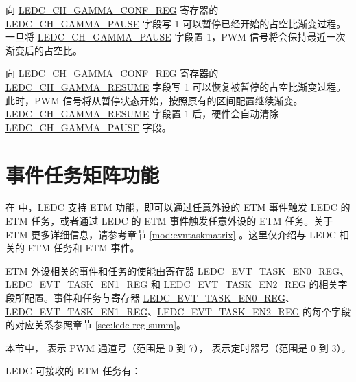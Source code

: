 \documentclass[main\_\_CN.tex]{subfiles}
\begin{document}
向 \hyperref[regdesc:LEDCCHNGAMMACONFREG]{LEDC\_CH\_GAMMA\_CONF\_REG} 寄存器的 \hyperref[fielddesc:LEDCCHNGAMMAPAUSE]{LEDC\_CH\_GAMMA\_PAUSE} 字段写 1 可以暂停已经开始的占空比渐变过程。一旦将 \hyperref[fielddesc:LEDCCHNGAMMAPAUSE]{LEDC\_CH\_GAMMA\_PAUSE} 字段置 1，PWM 信号将会保持最近一次渐变后的占空比。

向 \hyperref[regdesc:LEDCCHNGAMMACONFREG]{LEDC\_CH\_GAMMA\_CONF\_REG} 寄存器的 \hyperref[fielddesc:LEDCCHNGAMMARESUME]{LEDC\_CH\_GAMMA\_RESUME} 字段写 1 可以恢复被暂停的占空比渐变过程。此时，PWM 信号将从暂停状态开始，按照原有的区间配置继续渐变。\hyperref[fielddesc:LEDCCHNGAMMARESUME]{LEDC\_CH\_GAMMA\_RESUME} 字段置 1 后，硬件会自动清除 \hyperref[fielddesc:LEDCCHNGAMMAPAUSE]{LEDC\_CH\_GAMMA\_PAUSE} 字段。

\section{事件任务矩阵功能}

在 \chipname{} 中，LEDC 支持 ETM 功能，即可以通过任意外设的 ETM 事件触发 LEDC 的 ETM 任务，或者通过 LEDC 的 ETM 事件触发任意外设的 ETM 任务。关于 ETM 更多详细信息，请参考章节 \ref{mod:evntaskmatrix} 。这里仅介绍与 LEDC 相关的 ETM 任务和 ETM 事件。

ETM 外设相关的事件和任务的使能由寄存器 \hyperref[regdesc:LEDCEVTTASKEN0REG]{LEDC\_EVT\_TASK\_EN0\_REG}、\hyperref[regdesc:LEDCEVTTASKEN1REG]{LEDC\_EVT\_TASK\_EN1\_REG} 和 \hyperref[regdesc:LEDCEVTTASKEN2REG]{LEDC\_EVT\_TASK\_EN2\_REG} 的相关字段所配置。事件和任务与寄存器 \hyperref[regdesc:LEDCEVTTASKEN0REG]{LEDC\_EVT\_TASK\_EN0\_REG}、\hyperref[regdesc:LEDCEVTTASKEN1REG]{LEDC\_EVT\_TASK\_EN1\_REG}、\hyperref[regdesc:LEDCEVTTASKEN2REG]{LEDC\_EVT\_TASK\_EN2\_REG} 的每个字段的对应关系参照章节 \ref{sec:ledc-reg-summ}。

本节中， 表示 PWM 通道号（范围是 0 到 7）， 表示定时器号（范围是 0 到 3）。

LEDC 可接收的 ETM 任务有：
\end{document}
